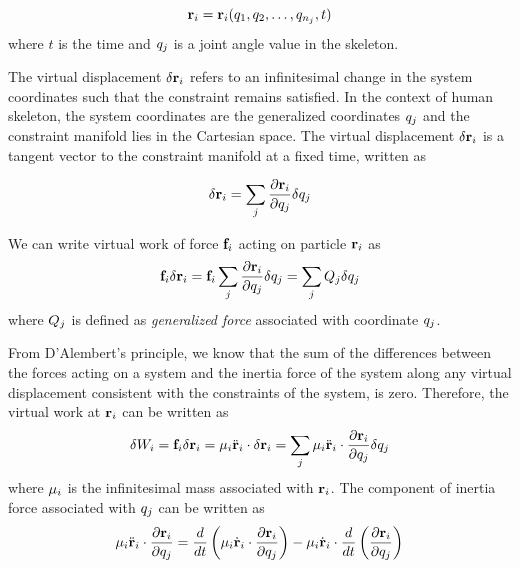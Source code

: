 \begin{equation}\label{eq:general_coord}
    \mathbf{r}_i = \mathbf{r}_i(q_{1},
q_{2}, \ldots, q_{n_j}, t)
\end{equation}
where $t$ is the time and $q_j$ is a joint angle value in
the skeleton.

The virtual displacement $\delta \mathbf{r}_i$ refers to an
infinitesimal change in the system coordinates such that the
constraint remains satisfied. In the context of human skeleton, the
system coordinates are the generalized coordinates $q_j$ and the
constraint manifold lies in the Cartesian space. The virtual
displacement $\delta \mathbf{r}_i$ is a tangent vector to the
constraint manifold at a fixed time, written as

\begin{equation}\label{eq:virtual_displace}
    \delta \mathbf{r}_i = \sum_j \frac{\partial \mathbf{r}_i}{\partial
    q_j}\delta q_j
\end{equation}

We can write virtual work of force $\mathbf{f}_{i}$ acting on particle
$\mathbf{r}_i$ as
\begin{equation}\label{eq:virtual_work}
  \mathbf{f}_{i} \delta \mathbf{r}_i = \mathbf{f}_{i} \sum_j \frac{\partial \mathbf{r}_i}{\partial
    q_j}\delta q_j = \sum_j Q_{j} \delta q_j
\end{equation}
where $Q_{j}$ is defined as \emph{generalized force}
associated with coordinate $q_j$.

From D'Alembert's principle, we know that the sum of the differences
between the forces acting on a system and the inertia force of the
system along any virtual displacement consistent with the constraints
of the system, is zero. Therefore, the virtual work at $\mathbf{r}_i$ can be written as
\begin{equation}\label{eq:inertial_work}
  \delta W_i = \mathbf{f}_{i} \delta \mathbf{r}_i = \mathbf{\mu}_i \ddot{\mathbf{r}}_i \cdot
    \delta \mathbf{r}_i = \sum_j \mathbf{\mu}_i \ddot{\mathbf{r}}_i \cdot
    \frac{\partial \mathbf{r}_i}{\partial q_j} \delta q_j
\end{equation}
where $\mathbf{\mu}_i$ is the infinitesimal mass associated with
$\mathbf{r}_i$. The component of inertia force associated with
$q_j$ can be written as
\begin{equation}
\label{eq:inertia_force}
  \mathbf{\mu}_i \ddot{\mathbf{r}}_i \cdot \frac{\partial \mathbf{r}_i}{\partial q_j} =
  \frac{d}{dt} \left( \mathbf{\mu}_i \dot{\mathbf{r}}_i \cdot \frac{\partial
  \mathbf{r}_i}{\partial q_j} \right) - \mathbf{\mu}_i
\dot{\mathbf{r}}_i \cdot \frac{d}{dt} \left( \frac{\partial
    \mathbf{r}_i}{\partial q_j} \right) 
\end{equation}

